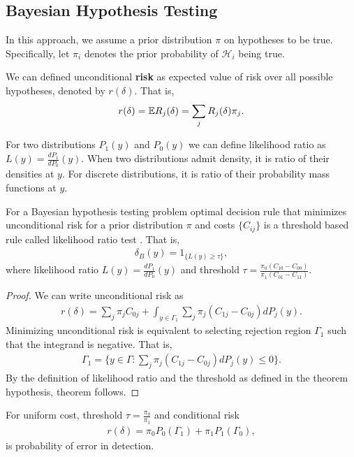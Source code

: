 \documentclass[a4paper,english,12pt]{article}
\begin{document}
\subsection{Bayesian Hypothesis Testing}
In this approach, we assume a prior distribution $\pi$ on hypotheses to be true. Specifically, let $\pi_i$ denotes the prior probability of $\mathcal{H}_i$ being true.
\begin{defn} We can defined unconditional \textbf{risk} as expected value of risk over all possible hypotheses, denoted by $r(\delta)$. That is,
\begin{align*}
r(\delta) = \mathbb{E} R_j(\delta) = \sum_j R_j(\delta) \pi_j.
\end{align*} 
\end{defn}
\begin{defn} For two distributions $P_1(y)$ and $P_0(y)$ we can define likelihood ratio as $L(y) = \frac{dP_1}{dP_0}(y)$. When two distributions admit density, it is ratio of their densities at $y$. For discrete distributions, it is ratio of their probability mass functions at $y$.
\end{defn}
\begin{thm} For a Bayesian hypothesis testing problem optimal decision rule that minimizes unconditional risk for a prior distribution $\pi$ and costs $\{C_{ij}\}$ is a threshold based rule called likelihood ratio test . That is,
\begin{align*}
\delta_B(y) = 1_{\{ L(y) \geq \tau\}},
\end{align*}
where likelihood ratio $L(y) = \frac{dP_1}{dP_0}(y)$ and threshold $\tau = \frac{\pi_0(C_{10}-C_{00})}{\pi_1(C_{01}-C_{11})}$.
\end{thm}
\begin{proof}
We can write unconditional risk as 
\begin{align*}
r(\delta) = \sum_{j}\pi_jC_{0j} + \int_{y \in \Gamma_1}\sum_{j}\pi_j(C_{1j} - C_{0j})dP_j(y).
\end{align*}
Minimizing unconditional risk is equivalent to selecting rejection region $\Gamma_1$ such that the integrand is negative. That is,
\begin{align*}
\Gamma_1 = \{ y \in \Gamma: \sum_{j}\pi_j(C_{1j} - C_{0j}) dP_j(y) \leq 0 \}.
\end{align*}
By the definition of likelihood ratio and the threshold as defined in the theorem hypothesis, theorem follows.
\end{proof}
\begin{rem} For uniform cost, threshold $\tau = \frac{\pi_0}{\pi_1}$ and conditional risk 
\begin{align*}
r(\delta) = \pi_0P_0(\Gamma_1) + \pi_1P_1(\Gamma_0),
\end{align*}
is probability of error in detection. 
\end{rem}
\end{document}
